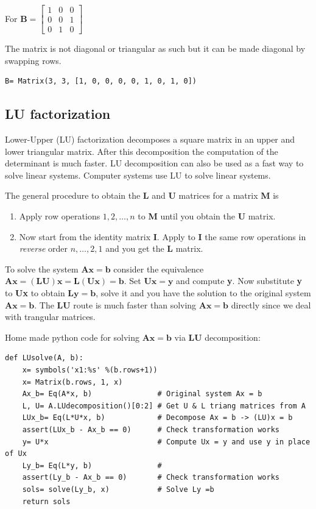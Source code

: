 For $\mathbf{B}= \left[\begin{matrix}1 & 0 & 0\\0 & 0 & 1\\0 & 1 & 0\end{matrix}\right]$

The matrix is not diagonal or triangular as such but it can be made diagonal by
swapping rows.

\begin{verbatim}
B= Matrix(3, 3, [1, 0, 0, 0, 0, 1, 0, 1, 0])
\end{verbatim}

\subsection{LU factorization}

Lower-Upper (LU) factorization decomposes a square matrix in an upper and lower
triangular matrix. After this decomposition the computation of the determinant is
much faster. LU decomposition can also be used as a fast way to solve linear systems.
Computer systems use LU to solve linear systems.

The general procedure to obtain the \textbf{L} and \textbf{U} matrices for a matrix 
\textbf{M} is
\begin{enumerate}
\item Apply row operations $1, 2, \dots, n$ to \textbf{M} until you obtain the \textbf{U} matrix.
\item Now start from the identity matrix \textbf{I}. Apply to \textbf{I} the same row
operations in \emph{reverse} order $n, \dots, 2, 1$ and you get the \textbf{L} matrix.
\end{enumerate}

To solve the system $\mathbf{Ax= b}$ consider the equivalence $\mathbf{Ax = (LU)x = L(Ux) = b}$.
Set $\mathbf{Ux = y}$ and compute \textbf{y}. Now substitute \textbf{y} to
\textbf{Ux} to obtain $\mathbf{Ly = b}$, solve it and you have the solution to the
original system $\mathbf{Ax = b}$. The \textbf{LU} route is much faster than solving
$\mathbf{Ax = b}$ directly since we deal with trangular matrices. 

Home made python code for solving $\mathbf{Ax = b}$ via \textbf{LU} decomposition:

\begin{verbatim}
def LUsolve(A, b):
    x= symbols('x1:%s' %(b.rows+1))
    x= Matrix(b.rows, 1, x)
    Ax_b= Eq(A*x, b)               # Original system Ax = b
    L, U= A.LUdecomposition()[0:2] # Get U & L triang matrices from A
    LUx_b= Eq(L*U*x, b)            # Decompose Ax = b -> (LU)x = b
    assert(LUx_b - Ax_b == 0)      # Check transformation works
    y= U*x                         # Compute Ux = y and use y in place of Ux
    Ly_b= Eq(L*y, b)               #
    assert(Ly_b - Ax_b == 0)       # Check transformation works
    sols= solve(Ly_b, x)           # Solve Ly =b
    return sols
\end{verbatim}


